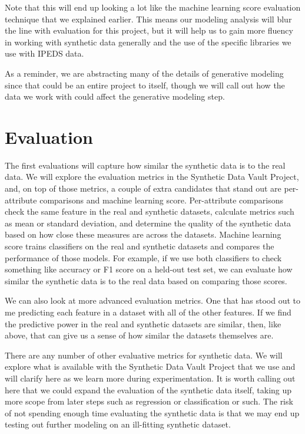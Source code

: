 \documentclass[sigconf, authorversion, nonacm]{acmart}
\begin{document}
        Note that this will end up looking a lot like the machine learning score evaluation technique that we explained earlier. This means our modeling analysis will blur the line with evaluation for this project, but it will help us to gain more fluency in working with synthetic data generally and the use of the specific libraries we use with IPEDS data.

        As a reminder, we are abstracting many of the details of generative modeling since that could be an entire project to itself, though we will call out how the data we work with could affect the generative modeling step.

\section{Evaluation}
    The first evaluations will capture how similar the synthetic data is to the real data. We will explore the evaluation metrics in the Synthetic Data Vault Project, and, on top of those metrics, a couple of extra candidates that stand out are per-attribute comparisons and machine learning score. Per-attribute comparisons check the same feature in the real and synthetic datasets, calculate metrics such as mean or standard deviation, and determine the quality of the synthetic data based on how close these measures are across the datasets. Machine learning score trains classifiers on the real and synthetic datasets and compares the performance of those models. For example, if we use both classifiers to check something like accuracy or F1 score on a held-out test set, we can evaluate how similar the synthetic data is to the real data based on comparing those scores.

    We can also look at more advanced evaluation metrics. One that has stood out to me predicting each feature in a dataset with all of the other features. If we find the predictive power in the real and synthetic datasets are similar, then, like above, that can give us a sense of how similar the datasets themselves are.

    There are any number of other evaluative metrics for synthetic data. We will explore what is available with the Synthetic Data Vault Project that we use and will clarify here as we learn more during experimentation. It is worth calling out here that we could expand the evaluation of the synthetic data itself, taking up more scope from later steps such as regression or classification or such. The risk of not spending enough time evaluating the synthetic data is that we may end up testing out further modeling on an ill-fitting synthetic dataset.
\end{document}
